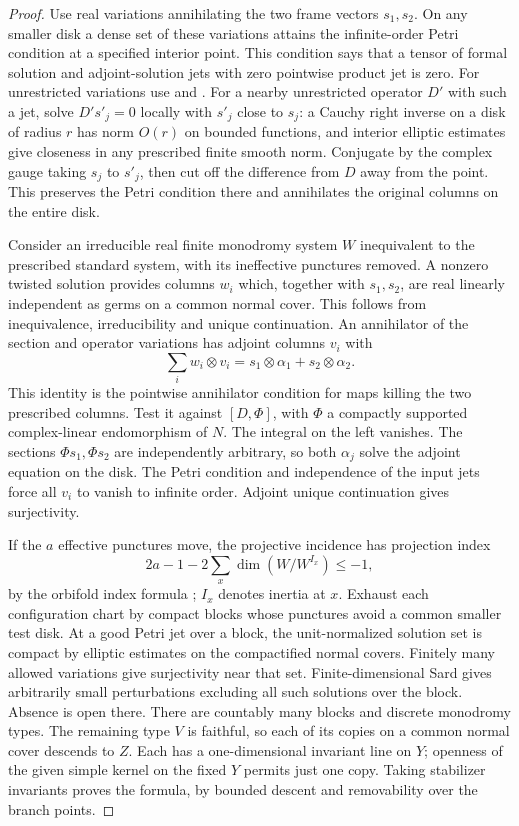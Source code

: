 \begin{proof}
Use real variations annihilating the two frame vectors $s_1,s_2$.
On any smaller disk a dense set of these variations attains the
infinite-order Petri condition at a specified interior point. This
condition says that a tensor of formal solution and adjoint-solution
jets with zero pointwise product jet is zero. For unrestricted
variations use \cite[Corollary~5.10]{wendl} and
\cite[Theorems~1.6.17 and~2.5.3]{dwbn}. For a nearby unrestricted
operator $D'$ with such a jet, solve $D's'_j=0$ locally with $s'_j$
close to $s_j$: a Cauchy right inverse on a disk of radius $r$ has
norm $O(r)$ on bounded functions, and interior elliptic estimates
give closeness in any prescribed finite smooth norm. Conjugate by the
complex gauge taking $s_j$ to $s'_j$, then cut off the difference from
$D$ away from the point. This preserves the Petri condition there and
annihilates the original columns on the entire disk.

Consider an irreducible real finite monodromy system $W$ inequivalent
to the prescribed standard system, with its ineffective punctures
removed. A nonzero twisted solution provides columns $w_i$ which,
together with $s_1,s_2$, are real linearly independent as germs on a
common normal cover. This follows from inequivalence, irreducibility
and unique continuation. An annihilator of the section and operator
variations has adjoint columns $v_i$ with
\[
        \sum_i w_i\otimes v_i=s_1\otimes\alpha_1+s_2\otimes\alpha_2.
\]
This identity is the pointwise annihilator condition for maps killing
the two prescribed columns. Test it against $[D,\Phi]$, with $\Phi$ a
compactly supported complex-linear endomorphism of $N$. The integral
on the left vanishes. The sections $\Phi s_1,\Phi s_2$ are
independently arbitrary, so both $\alpha_j$ solve the adjoint equation
on the disk. The Petri condition and independence of the input jets
force all $v_i$ to vanish to infinite order. Adjoint unique
continuation gives surjectivity.

If the $a$ effective punctures move, the projective incidence has
projection index
\[
       2a-1-2\sum_x\dim(W/W^{I_x})\le -1 ,
\]
by the orbifold index formula \cite[Proposition~2.8.6]{dwbn};
$I_x$ denotes inertia at $x$. Exhaust each configuration chart by
compact blocks whose punctures avoid a common smaller test disk.
At a good Petri jet over a block, the unit-normalized solution set is
compact by elliptic estimates on the compactified normal covers.
Finitely many allowed variations give surjectivity near that set.
Finite-dimensional Sard gives arbitrarily small perturbations excluding
all such solutions over the block. Absence is open there. There are
countably many blocks and discrete monodromy types. The remaining
type $V$ is faithful, so each of its copies on a common normal cover
descends to $Z$. Each has a one-dimensional invariant line on $Y$;
openness of the given simple kernel on the fixed $Y$ permits just one
copy. Taking stabilizer invariants proves the formula, by bounded
descent and removability over the branch points.
\end{proof}

